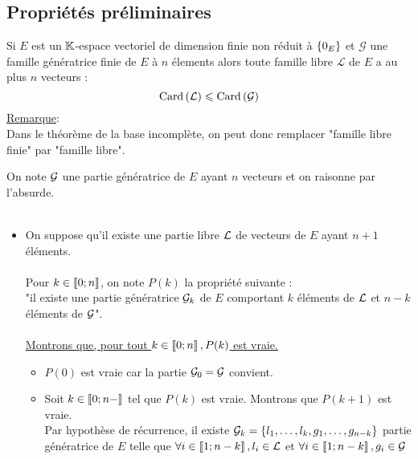 \subsection{Propriétés préliminaires}
\begin{defprop}
    Si \(E\) est un \(\K\)-espace vectoriel de dimension finie non réduit à \(\accol{0_E}\) et \(\mathcal{G}\) une famille génératrice finie de \(E\) à \(n\) élements alors toute famille libre \(\mathcal{L}\) de \(E\) a au plus \(n\) vecteurs :
    \[\Card{\mathcal{L}} \leq \Card{\mathcal{G}} \]
    \underline{Remarque}:\\
    Dans le théorème de la base incomplète, on peut donc remplacer "famille libre finie" par "famille libre".
\end{defprop}
\begin{dem}
    On note \(\cal{G}\) une partie génératrice de \(E\) ayant \(n\) vecteurs et on raisonne par l’absurde.\\~\\
    \begin{itemize}
        \item On suppose qu’il existe une partie libre \(\cal{L}\) de vecteurs de \(E\) ayant \(n + 1\) éléments.\\~\\
        Pour \(k \in \interventierii{0}{n}\), on note \(P(k)\) la propriété suivante :\\
        "il existe une partie génératrice \(\cal{G}_k\) de \(E\) comportant \(k\) éléments de \(\cal{L}\) et \(n - k\) éléments de \(\cal{G}\)".\\~\\
        \underline{Montrons que, pour tout \(k \in \interventierii{0}{n}, P(k)\) est vraie.}
        \begin{itemize}
            \item \(P(0)\) est vraie car la partie \(\cal{G}_0 = \cal{G}\) convient.\\
            \item Soit \(k \in \interventierii{0}{n-}\) tel que \(P(k)\) est vraie. Montrons que \(P(k + 1)\) est vraie.\\
             Par hypothèse de récurrence, il existe \(\cal{G}_k = \accol{l_1, \dots , l_k, g_1, \dots , g_{n-k}}\) partie génératrice de \(E\) telle que \(\forall i \in \interventierii{1}{n-k} , l_i \in \cal{L}\) et \(\forall i \in \interventierii{1}{n-k} , g_i \in \cal{G}\)\\~\\

\end{itemize}
\end{itemize}
\end{dem}
